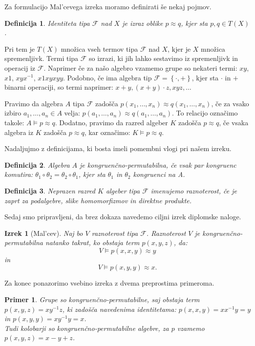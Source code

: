 \documentclass[a4paper,11pt]{article}
\newtheorem{izrek}{Izrek}
\newtheorem{definicija}{Definicija}
\newtheorem{primer}{Primer}
\begin{document}
Za formulacijo Mal'cevega izreka moramo definirati še nekaj pojmov. 
\begin{definicija}
    \emph{Identiteta} tipa $\mathcal{F}$ nad $X$ je izraz oblike $p \approx q$, kjer sta $p, q \in T\left(X\right)$.
\end{definicija}
Pri tem je $T\left(X\right)$ množica vseh termov tipa $\mathcal{F}$ nad $X$, kjer je $X$ množica spremenljivk. Termi 
tipa $\mathcal{F}$ so izrazi, ki jih lahko sestavimo iz spremenljivk in operacij iz $\mathcal{F}$. Naprimer če za našo 
algebro vzamemo grupe so nekateri termi: $xy$, $x1$, $xyx^{-1}$, $x1xyxyy$. Podobno, če ima algebra tip $\mathcal{F} =
\left\{\cdot, +\right\}$, kjer sta $\cdot$ in $+$ binarni operaciji, so termi naprimer: $x+y, (x+y) \cdot z, xyz, \ldots$

Pravimo da algebra $A$ tipa $\mathcal{F}$ zadošča $p\left(x_1, \ldots, x_n\right)\approx q\left(x_1, \ldots, x_n\right)$,
če za vsako izbiro $a_1, \ldots, a_n \in A$ velja: $p\left(a_1, \ldots, a_n\right) \approx q\left(a_1, 
\ldots, a_n\right)$. To relacijo označimo takole: $A \models p \approx q$. Dodatno, pravimo da razred algeber $K$ 
zadošča $p \approx q$, če vsaka algebra iz $K$ zadošča $p \approx q$, kar označimo: $K \models p \approx q$.

Nadaljujmo z definicijama, ki bosta imeli pomembni vlogi pri našem izreku.

\begin{definicija}
    Algebra $A$ je \emph{kongruenčno-permutabilna}, če vsak par kongruenc komutira: $\theta_1 \circ \theta_2 =
    \theta_2 \circ \theta_1$, kjer sta $\theta_1$ in $\theta_2$ kongruenci na A. 
\end{definicija}

\begin{definicija}
    Neprazen razred $K$ algeber tipa $\mathcal{F}$ imenujemo \emph{raznoterost}, če je zaprt za podalgebre, 
    slike homomorfizmov in direktne produkte.
\end{definicija}

Sedaj smo pripravljeni, da brez dokaza navedemo ciljni izrek diplomske naloge.

\begin{izrek}[Mal'cev] Naj bo $V$ raznoterost tipa $\mathcal{F}$. Raznoterost $V$ je kongruenčno-permutabilna
    natanko takrat, ko obstaja term $p\left(x, y, z\right)$, da: \\ $$V \models p\left(x,x,y\right)\approx y$$ 
    in $$V \models p\left(x,y,y\right)\approx x.$$   
\end{izrek}

Za konec ponazorimo vsebino izreka z dvema preprostima primeroma. \nocite{Burris_Sankappanavar_1981}

\begin{primer}
    Grupe so kongruenčno-permutabilne, saj obstaja term $p(x,y,z)=xy^{-1}z$, ki zadošča navedenima identitetama:
    $p(x,x,y)= xx^{-1}y=y$ in $p(x, y, y)=xy^{-1}y=x$.\\
    Tudi kolobarji so kongruenčno-permutabilne algebre, za $p$ vzamemo $p(x,y,z)= x-y+z$.
\end{primer}

\printbibliography
\end{document}
